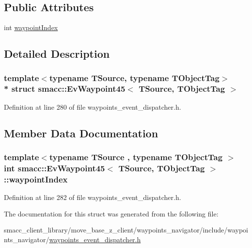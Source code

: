 \subsection*{Public Attributes}
\begin{DoxyCompactItemize}
\item 
int \hyperlink{structsmacc_1_1EvWaypoint45_a45aad4803d495dc7db9e8a0eaab6f876}{waypoint\+Index}
\end{DoxyCompactItemize}


\subsection{Detailed Description}
\subsubsection*{template$<$typename T\+Source, typename T\+Object\+Tag$>$\\*
struct smacc\+::\+Ev\+Waypoint45$<$ T\+Source, T\+Object\+Tag $>$}



Definition at line 280 of file waypoints\+\_\+event\+\_\+dispatcher.\+h.



\subsection{Member Data Documentation}
\subsubsection[{\texorpdfstring{waypoint\+Index}{waypointIndex}}]{\setlength{\rightskip}{0pt plus 5cm}template$<$typename T\+Source , typename T\+Object\+Tag $>$ int {\bf smacc\+::\+Ev\+Waypoint45}$<$ T\+Source, T\+Object\+Tag $>$\+::waypoint\+Index}\hypertarget{structsmacc_1_1EvWaypoint45_a45aad4803d495dc7db9e8a0eaab6f876}{}\label{structsmacc_1_1EvWaypoint45_a45aad4803d495dc7db9e8a0eaab6f876}


Definition at line 282 of file waypoints\+\_\+event\+\_\+dispatcher.\+h.



The documentation for this struct was generated from the following file\+:\begin{DoxyCompactItemize}
\item 
smacc\+\_\+client\+\_\+library/move\+\_\+base\+\_\+z\+\_\+client/waypoints\+\_\+navigator/include/waypoints\+\_\+navigator/\hyperlink{waypoints__event__dispatcher_8h}{waypoints\+\_\+event\+\_\+dispatcher.\+h}\end{DoxyCompactItemize}
